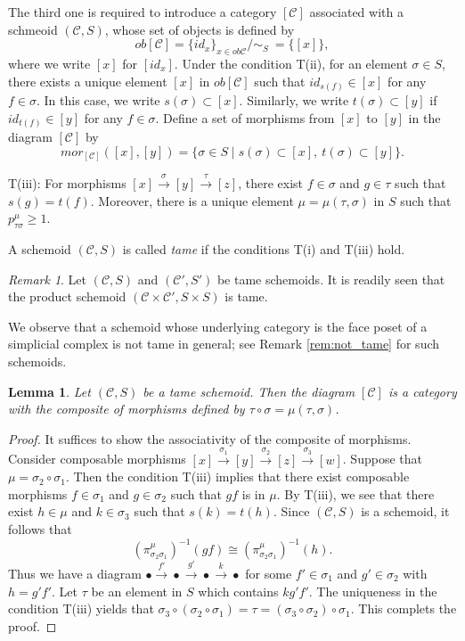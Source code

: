 \documentclass{amsart}
\newtheorem{lem}[thm]{Lemma}
\theoremstyle{definition}
\theoremstyle{remark}
\newtheorem{rem}[thm]{Remark}
\newcommand{\C}{{\mathcal C}}
\begin{document}
The third one is required to introduce a category $[\C]$ associated with a schmeoid $(\C, S)$,  
whose set of objects is defined by   
$$
ob [\C] = \{id_x\}_{x \in ob\C} \slash \sim_S \ =\{[x] \},  
$$ 
where we write $[x]$ for $[id_x]$.  Under the condition T(ii), for an element $\sigma \in S$, there exists a unique 
element $[x]$ in $ob[\C]$ such that $id_{s(f)} \in [x]$ for any $f \in \sigma$. In this case, we write $s(\sigma) \subset [x]$. 
Similarly, we write $t(\sigma) \subset [y]$ if $id_{t(f)} \in [y]$ for any $f \in \sigma$. 
Define a set of morphisms from $[x]$ to $[y]$ in the diagram $[\C]$ by 
$$
mor_{[\C]}([x], [y]) = \{\sigma \in S \mid s(\sigma) \subset [x], \ t(\sigma) \subset [y]\}.     
$$

\noindent
T(iii): For morphisms $[x] \stackrel{\sigma}{\longrightarrow} [y] \stackrel{\tau}{\longrightarrow} [z]$, 
there exist $f \in \sigma$ and 
$g \in \tau$ such that $s(g) = t(f)$. Moreover, there is a unique element $\mu = \mu(\tau, \sigma)$ in $S$ 
such that $p_{\tau \sigma}^{\mu} \geq 1$.  

\medskip
A schemoid $(\C, S)$ is called {\it tame} if the conditions T(i) and T(iii) hold.  

\begin{rem}
Let $(\C, S)$ and $(\C', S')$ be tame schemoids. It is readily seen that 
the product schemoid $(\C \times \C', S\times S)$ is tame. 
\end{rem}

We observe that a schemoid whose underlying category is the face poset of a simplicial complex is not tame in general; 
see Remark \ref{rem:not_tame} for such schemoids.   

\begin{lem} Let $(\C, S)$ be a tame schemoid. Then the diagram $[\C]$ is a category with the composite of morphisms 
defined by $\tau \circ \sigma = \mu(\tau, \sigma)$. 
\end{lem}

\begin{proof}
It suffices to show the associativity of the composite of morphisms. Consider composable morphisms 
$[x] \stackrel{\sigma_1}{\longrightarrow}[y]\stackrel{\sigma_2}{\longrightarrow}[z]\stackrel{\sigma_3}{\longrightarrow}[w]$. 
Suppose that $\mu = \sigma_2\circ \sigma_1$. Then the condition T(iii) implies that there exist composable morphisms 
$f \in \sigma_1$ and $g \in \sigma_2$ such that $gf$ is in $\mu$. By T(iii), we see that there exist $h \in \mu$ and $k \in \sigma_3$ such that $s(k) = t(h)$. Since $(\C, S)$ is a schemoid, it follows that 
\[
(\pi_{\sigma_2\sigma_1}^\mu)^{-1}(gf) \cong (\pi_{\sigma_2\sigma_1}^\mu)^{-1}(h). 
\]
Thus we have a diagram 
$\bullet \stackrel{f'}{\longrightarrow} \bullet \stackrel{g'}{\longrightarrow} \bullet  \stackrel{k}{\longrightarrow} \bullet$
for some $f' \in \sigma_1$ and $g' \in \sigma_2$ with $h=g'f'$. Let $\tau$ be an element in $S$ which contains $kg'f'$. 
The uniqueness in the condition T(iii) yields that 
$\sigma_3\circ (\sigma_2\circ \sigma_1) = \tau = (\sigma_3\circ \sigma_2) \circ \sigma_1$. This complets the proof.   
\end{proof}
\end{document}
